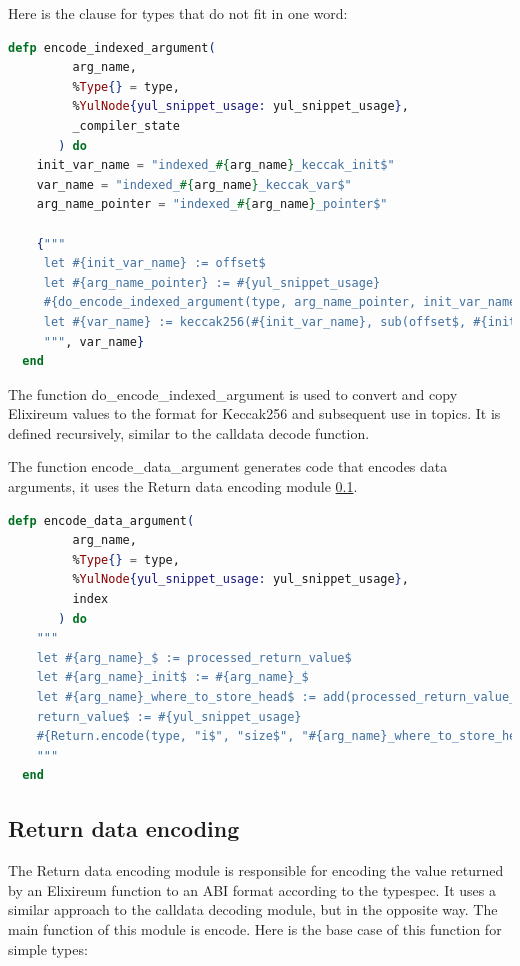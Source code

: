 Here is the clause for types that do not fit in one word:

\begin{lstlisting}[language=elixir, caption={Encode compex type indexed argument}, label={lst:encode_indexed_argument}]
  defp encode_indexed_argument(
         arg_name,
         %Type{} = type,
         %YulNode{yul_snippet_usage: yul_snippet_usage},
         _compiler_state
       ) do
    init_var_name = "indexed_#{arg_name}_keccak_init$"
    var_name = "indexed_#{arg_name}_keccak_var$"
    arg_name_pointer = "indexed_#{arg_name}_pointer$"

    {"""
     let #{init_var_name} := offset$
     let #{arg_name_pointer} := #{yul_snippet_usage}
     #{do_encode_indexed_argument(type, arg_name_pointer, init_var_name, 0)}
     let #{var_name} := keccak256(#{init_var_name}, sub(offset$, #{init_var_name}))
     """, var_name}
  end
\end{lstlisting}

The function do\_encode\_indexed\_argument is used to convert and copy Elixireum values to the format for Keccak256 and subsequent use in topics. It is defined recursively, similar to the calldata decode function.


The function encode\_data\_argument generates code that encodes data arguments, it uses the Return data encoding module \ref{ssec:return_data_encoding}. 

\begin{lstlisting}[language=elixir, caption={Encode data argument}, label={lst:encode_data_argument}]
  defp encode_data_argument(
         arg_name,
         %Type{} = type,
         %YulNode{yul_snippet_usage: yul_snippet_usage},
         index
       ) do
    """
    let #{arg_name}_$ := processed_return_value$
    let #{arg_name}_init$ := #{arg_name}_$
    let #{arg_name}_where_to_store_head$ := add(processed_return_value_init$, #{index * 32})
    return_value$ := #{yul_snippet_usage}
    #{Return.encode(type, "i$", "size$", "#{arg_name}_where_to_store_head$", "where_to_store_head_init$")}
    """
  end
\end{lstlisting}


\subsection{Return data encoding}
\label{ssec:return_data_encoding}

The Return data encoding module is responsible for encoding the value returned by an Elixireum function to an ABI format according to the typespec. It uses a similar approach to the calldata decoding module, but in the opposite way. The main function of this module is encode. Here is the base case of this function for simple types:


